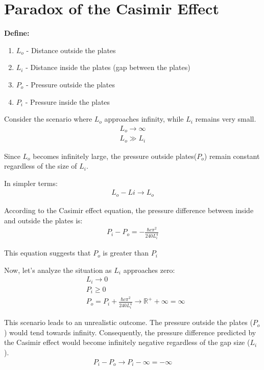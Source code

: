 \section{Paradox of the Casimir Effect}
\noindent\textbf{Define:}
\begin{enumerate}
    \item \(L_o\) - Distance outside the plates
    \item \(L_i\) - Distance inside the plates (gap between the plates)
    \item \(P_o\) - Pressure outside the plates
    \item \(P_i\) - Pressure inside the plates
\end{enumerate}

Consider the scenario where  $L_o$ approaches infinity, while $L_i$ remains very small.
\begin{align}
    L_o \rightarrow \infty \\
    L_o \gg L_i
\end{align}

Since $L_o$ becomes infinitely large, the pressure outside plates($P_o$) remain constant regardless of the size of $L_i$.

\noindent In simpler terms:
\begin{align}L_o - Li \rightarrow L_o\end{align}

According to the Casimir effect equation\citep*{enwiki:1212199656}, the pressure difference between inside and outside the plates is:
\begin{align}P_i - P_o = -\frac{\hbar c \pi^2}{240 L_i^4}\end{align}

This equation suggests that $P_o$ is greater than $P_i$

Now, let's analyze the situation as $L_i$ approaches zero:
\begin{align}
    &L_i \rightarrow 0 \\
    &P_i \ge 0 \\
    &P_o = P_i + \frac{\hbar c \pi^2}{240 L_i^4} \rightarrow {\mathbb{R}}^+ + \infty = \infty
\end{align}

This scenario leads to an unrealistic outcome. The pressure outside the plates ($P_o$) would tend towards infinity.
Consequently, the pressure difference predicted by the Casimir effect would become infinitely negative regardless of the gap size ($L_i$).
\begin{align}P_i - P_o \rightarrow P_i - \infty = - \infty\end{align}

